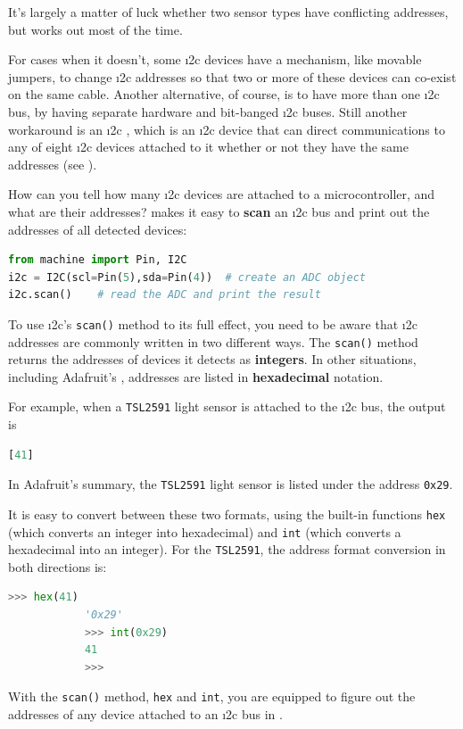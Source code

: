 It's largely a matter of luck whether two sensor types have conflicting addresses, but works out most of the time.

For cases when it doesn't, some \i2c devices have a mechanism, like movable jumpers, to change \i2c addresses so that two or more of these devices can co-exist on the same cable.
Another alternative, of course, is to have more than one \i2c bus, \eg by having separate hardware and bit-banged \i2c buses.
Still another workaround is an \i2c , which is an \i2c device that can direct communications to any of eight \i2c devices attached to it whether or  not they have the same addresses (see ).

	\begin{kaobox}[frametitle=Addressing the part!]How can you tell how many \i2c devices are attached to a microcontroller, and what are their addresses?
  \Micropython makes it easy to \textbf{scan} an \i2c bus and print out the addresses of all detected devices:
			\begin{lstlisting}[language=Python]
from machine import Pin, I2C
i2c = I2C(scl=Pin(5),sda=Pin(4))  # create an ADC object
i2c.scan()    # read the ADC and print the result\end{lstlisting}

		\smallskip
		To use \i2c's \lstinline{scan()} method to its full effect, you need to be aware that \i2c addresses are commonly written in two different ways.
		The \lstinline{scan()} method returns the addresses of devices it detects as \textbf{integers}.
		In other situations, including Adafruit's , addresses are listed in \textbf{hexadecimal} notation.

		For example, when a \texttt{TSL2591} light sensor is attached to the \i2c bus, the output is
    \begin{lstlisting}[language=Python]
[41]\end{lstlisting}
    In Adafruit's summary, the \texttt{TSL2591} light sensor is listed under the address \lstinline{0x29}.

		\smallskip
		It is easy to convert between these two formats, using the built-in functions \lstinline{hex} (which converts an integer into hexadecimal) and \lstinline{int} (which converts a hexadecimal into an integer).
		For the \texttt{TSL2591}, the address format conversion in both directions is:
    \begin{lstlisting}[language=Python]
			>>> hex(41)
			'0x29'
			>>> int(0x29)
			41
			>>>\end{lstlisting}
    With the \lstinline{scan()} method, \lstinline{hex} and \lstinline{int}, you are equipped to figure out the addresses of any device attached to an \i2c bus in \Micropython.
	\end{kaobox}

